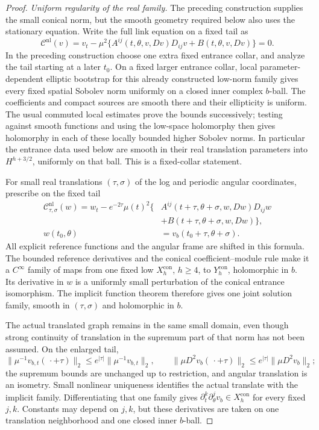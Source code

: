 \begin{proof}
\emph{Uniform regularity of the real family.}
The preceding construction supplies the small conical norm, but the
smooth geometry required below also uses the stationary equation.
Write the full link equation on a fixed tail as
\[
 \mathcal C^{\mathrm{nl}}(v)=v_t-\mu^2
 \{A^{ij}(t,\theta,v,Dv)D_{ij}v+B(t,\theta,v,Dv)\}=0.
\]
In the preceding construction choose one extra fixed entrance collar,
and analyze the tail starting at a later $t_0$.
On a fixed larger entrance collar, local parameter-dependent elliptic
bootstrap for this already constructed low-norm family gives every fixed
spatial Sobolev norm uniformly on a closed inner complex $b$-ball.
The coefficients and compact sources are smooth there and their ellipticity
is uniform.  The usual commuted local estimates prove the bounds successively;
testing against smooth functions and using the low-space holomorphy then
gives holomorphy in each of these locally bounded higher Sobolev norms.
In particular the entrance data used below are smooth in their real
translation parameters into $H^{h+3/2}$, uniformly on that ball.
This is a fixed-collar statement.

For small real translations $(\tau,\sigma)$ of the log and periodic angular
coordinates, prescribe on the fixed tail
\begin{align*}
 \mathcal C^{\mathrm{nl}}_{\tau,\sigma}(w)
 =w_t-e^{-2\tau}\mu(t)^2
 \{&A^{ij}(t+\tau,\theta+\sigma,w,Dw)D_{ij}w\\
   &+B(t+\tau,\theta+\sigma,w,Dw)\},\\
 w(t_0,\theta)&=v_b(t_0+\tau,\theta+\sigma).
\end{align*}
All explicit reference functions and the angular frame are shifted in this
formula.  The bounded reference derivatives and the conical coefficient--module
rule make it a $C^\infty$ family of maps from one fixed low
$X^{\mathrm{con}}_h$, $h\ge4$, to $Y^{\mathrm{con}}_h$, holomorphic in $b$.
Its derivative in $w$ is a uniformly small perturbation of the conical
entrance isomorphism.  The implicit function theorem therefore gives one
joint solution family, smooth in $(\tau,\sigma)$ and holomorphic in $b$.

The actual translated graph remains in the same small domain, even though
strong continuity of translation in the supremum part of that norm has
not been assumed.  On the enlarged tail,
\[
 \|\mu^{-1}v_{b,t}(\,\cdot+\tau)\|_2
 \le e^{|\tau|}\|\mu^{-1}v_{b,t}\|_2,\qquad
 \|\mu D^2v_b(\,\cdot+\tau)\|_2
 \le e^{|\tau|}\|\mu D^2v_b\|_2;
\]
the supremum bounds are unchanged up to restriction, and angular translation
is an isometry.  Small nonlinear uniqueness identifies the actual translate
with the implicit family.  Differentiating that one family gives
$\partial_t^k\partial_\theta^jv_b\in X^{\mathrm{con}}_h$ for every fixed
$j,k$.  Constants may depend on $j,k$, but these derivatives are taken on
one translation neighborhood and one closed inner $b$-ball.


\end{proof}
